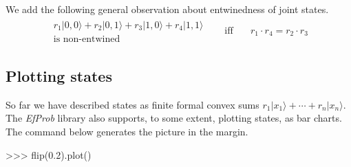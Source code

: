\documentclass[leqno]{tufte-book} %
\newcommand{\EfProb}{\textit{EfProb}\xspace}
\newcommand{\ket}[1]{\ensuremath{|#1\rangle}}
\begin{document}
We add the following general observation about entwinedness of joint states.
\begin{equation}
\label{eqn:entwined}
\begin{array}{rcl}
\begin{array}{c}
r_{1}\ket{0,0} + r_{2}\ket{0,1} + r_{3}\ket{1,0} + r_{4}\ket{1,1}
\\[-.4em]
\mbox{is non-entwined}
\end{array}
& \quad\mbox{iff}\quad &
r_{1}\cdot r_{4} = r_{2}\cdot r_{3}
\end{array}
\end{equation}



\subsection{Plotting states}\label{subsec:dplot}

So far we have described states as finite formal convex sums
$r_{1}\ket{x_1} + \cdots + r_{n}\ket{x_n}$. The \EfProb library also
supports, to some extent, plotting states, as bar charts. The command
below generates the picture in the
margin.
\begin{python}
>>> flip(0.2).plot()
\end{python}
\end{document}
